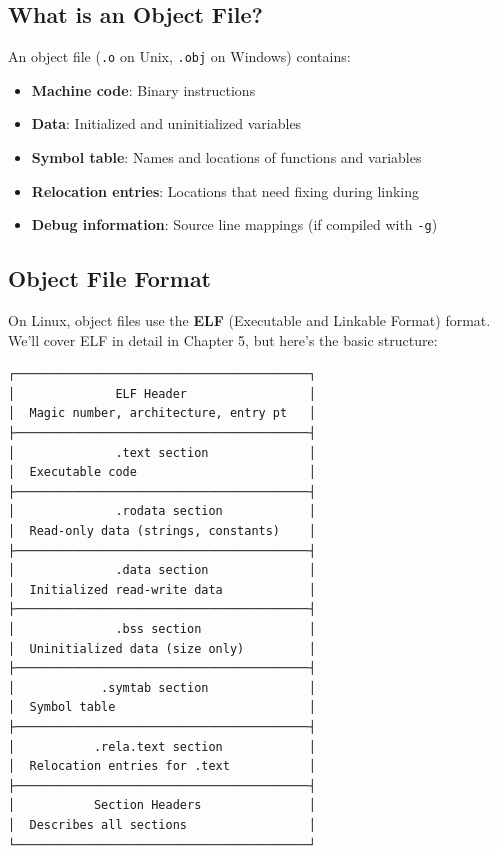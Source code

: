 \subsection{What is an Object File?}

An object file (\texttt{.o} on Unix, \texttt{.obj} on Windows) contains:
\begin{itemize}
    \item \textbf{Machine code}: Binary instructions
    \item \textbf{Data}: Initialized and uninitialized variables
    \item \textbf{Symbol table}: Names and locations of functions and variables
    \item \textbf{Relocation entries}: Locations that need fixing during linking
    \item \textbf{Debug information}: Source line mappings (if compiled with \texttt{-g})
\end{itemize}

\subsection{Object File Format}

On Linux, object files use the \textbf{ELF} (Executable and Linkable Format) format. We'll cover ELF in detail in Chapter 5, but here's the basic structure:

\begin{verbatim}
┌─────────────────────────────────────────┐
│              ELF Header                 │
│  Magic number, architecture, entry pt   │
├─────────────────────────────────────────┤
│              .text section              │
│  Executable code                        │
├─────────────────────────────────────────┤
│              .rodata section            │
│  Read-only data (strings, constants)    │
├─────────────────────────────────────────┤
│              .data section              │
│  Initialized read-write data            │
├─────────────────────────────────────────┤
│              .bss section               │
│  Uninitialized data (size only)         │
├─────────────────────────────────────────┤
│            .symtab section              │
│  Symbol table                           │
├─────────────────────────────────────────┤
│           .rela.text section            │
│  Relocation entries for .text           │
├─────────────────────────────────────────┤
│           Section Headers               │
│  Describes all sections                 │
└─────────────────────────────────────────┘
\end{verbatim}

